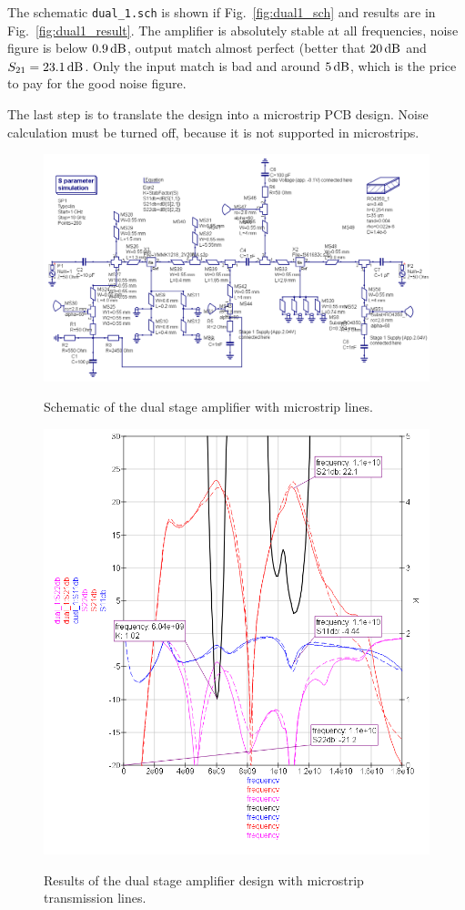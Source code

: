 The schematic {\tt dual\_1.sch} is shown if Fig.~\ref{fig:dual1_sch}
and results are in Fig.~\ref{fig:dual1_result}. The amplifier is
absolutely stable at all frequencies, noise figure is below
$0.9\,\mathrm{dB}$, output match almost perfect (better that
$20\,\mathrm{dB}$ and $S_{21}=23.1\,\mathrm{dB}$. Only the input match is
bad and around $5\,\mathrm{dB}$, which is the price to pay for the good
noise figure. 


The last step is to translate the design into a microstrip PCB
design. Noise calculation must be turned off, because it is not
supported in microstrips.

\begin{figure}
  \centering
  {\includegraphics[width=12cm]{dual2_sch.png}}
  \caption{Schematic of the dual stage amplifier with microstrip lines.}
  \label{fig:dual2_sch}
\end{figure}

\begin{figure}
  \centering
  {\includegraphics[width=12cm]{dual2_result.png}}
  \caption{Results of the dual stage amplifier design with microstrip 
    transmission lines.}
  \label{fig:dual2_result}
\end{figure}


